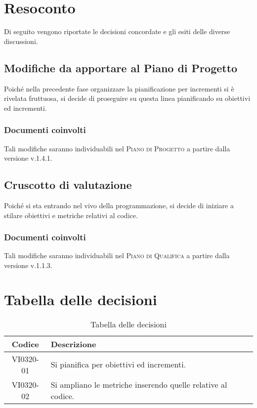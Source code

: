 \documentclass{article}
\begin{document}
\newpage
\section{Resoconto}
\label{sec:resoconto}

Di seguito vengono riportate le decisioni concordate e gli esiti delle diverse discussioni.

\subsection{Modifiche da apportare al Piano di Progetto}
\label{itm:1}

Poiché nella precedente fase organizzare la pianificazione per incrementi si è rivelata fruttuosa, si decide di proseguire su questa linea pianificando su obiettivi ed incrementi.
\subsubsection*{Documenti coinvolti}
Tali modifiche saranno individuabili nel \textsc{Piano di Progetto} a partire dalla versione v.1.4.1.

\subsection{Cruscotto di valutazione}
\label{itm:2}

Poiché si sta entrando nel vivo della programmazione, si decide di iniziare a stilare obiettivi e metriche relativi al codice.
\subsubsection*{Documenti coinvolti}
Tali modifiche saranno individuabili nel \textsc{Piano di Qualifica} a partire dalla versione v.1.1.3.


\newpage
\section{Tabella delle decisioni}%
\label{sub:decisioni}

\begin{table}[!ht]
	\centering
	\begin{tabular}{|c|p{13cm}|}
		\hline
		\rowcolor{lightgray}
		\textbf{Codice} & \textbf{Descrizione} \\ 
		\hline
			VI0320-01 & Si pianifica per obiettivi ed incrementi. \\
			VI0320-02 & Si ampliano le metriche inserendo quelle relative al codice. \\
		\hline
	\end{tabular}
	\caption{Tabella delle decisioni}
\end{table}
\end{document}
